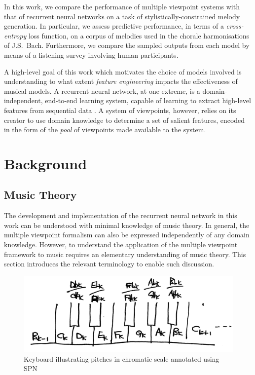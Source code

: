 \documentclass[12pt,a4paper,twoside,openright]{report}
\begin{document}
In this work, we compare the performance of multiple viewpoint systems with that
of recurrent neural networks on a task of stylistically-constrained melody
generation. In particular, we assess predictive performance, in terms of a
\emph{cross-entropy} loss function, on a corpus of melodies used in the chorale
harmonisations of J.S.\ Bach. Furthermore, we compare the sampled outputs from
each model by means of a listening survey involving human participants.

A high-level goal of this work which motivates the choice of models involved is
understanding to what extent \emph{feature engineering} impacts the
effectiveness of musical models. A recurrent neural network, at one extreme, is
a domain-independent, end-to-end learning system, capable of learning to extract
high-level features from sequential data \cite{Goodfellow-et-al-2016}. A system
of viewpoints, however, relies on its creator to use domain knowledge to
determine a set of salient features, encoded in the form of the \emph{pool} of
viewpoints made available to the system.

\section{Background}

\subsection{Music Theory}

The development and implementation of the recurrent neural network in this work
can be understood with minimal knowledge of music theory. In general, the
multiple viewpoint formalism can also be expressed independently of any domain
knowledge.  However, to understand the application of the multiple viewpoint
framework to music requires an elementary understanding of music theory.  This
section introduces the relevant terminology to enable such discussion.

\begin{figure}[H]
\centering
\includegraphics[width=350pt]{figs/piano_spn_tmp.jpg}
\caption{Keyboard illustrating pitches in chromatic scale annotated using SPN}
\label{fig:keyboard-spn}
\end{figure}
\end{document}
